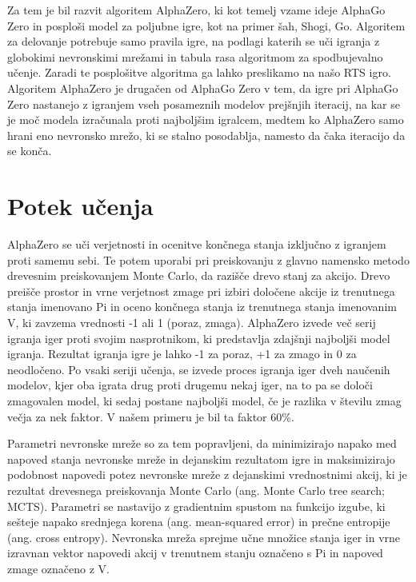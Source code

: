 \documentclass[a4paper, 12pt]{book}
\begin{document}
\noindent
Za tem je bil razvit algoritem AlphaZero, ki kot temelj vzame ideje AlphaGo Zero in posploši model za poljubne igre, kot na primer šah, Shogi, Go.
Algoritem za delovanje potrebuje samo pravila igre, na podlagi katerih se uči igranja z globokimi nevronskimi mrežami in tabula rasa algoritmom za spodbujevalno učenje.
Zaradi te posplošitve algoritma ga lahko preslikamo na našo RTS igro.
Algoritem AlphaZero je drugačen od AlphaGo Zero v tem, da igre pri AlphaGo Zero nastanejo z igranjem vseh posameznih modelov prejšnjih iteracij, na kar se je moč modela izračunala proti najboljšim igralcem, medtem ko AlphaZero samo hrani eno nevronsko mrežo, ki se stalno posodablja, namesto da čaka iteracijo da se konča.

\section{Potek učenja}
\label{potekUcenja}
AlphaZero se uči verjetnosti in ocenitve končnega stanja izključno z igranjem proti samemu sebi. 
Te potem uporabi pri preiskovanju z glavno namensko metodo drevesnim preiskovanjem Monte Carlo, da razišče drevo stanj za akcijo.
Drevo preišče prostor in vrne verjetnost zmage pri izbiri določene akcije iz trenutnega stanja imenovano Pi in oceno končnega stanja iz trenutnega stanja imenovanim V, ki zavzema vrednosti -1 ali 1 (poraz, zmaga).
AlphaZero izvede več serij igranja iger proti svojim nasprotnikom, ki predstavlja zdajšnji najboljši model igranja.
Rezultat igranja igre je lahko -1 za poraz, +1 za zmago in 0 za neodločeno.
Po vsaki seriji učenja, se izvede proces igranja iger dveh naučenih modelov, kjer oba igrata drug proti drugemu nekaj iger, na to pa se določi zmagovalen model, ki sedaj postane najboljši model, če je razlika v številu zmag večja za nek faktor. V našem primeru je bil ta faktor 60\%.

Parametri nevronske mreže so za tem popravljeni, da minimizirajo napako med napoved stanja nevronske mreže in dejanskim rezultatom igre in maksimizirajo podobnost napovedi potez nevronske mreže z dejanskimi vrednostnimi akcij, ki je rezultat drevesnega preiskovanja Monte Carlo (ang. Monte Carlo tree search; MCTS). 
Parametri se nastavijo z gradientnim spustom na funkcijo izgube, ki sešteje napako srednjega korena (ang. mean-squared error) in prečne entropije (ang. cross entropy).
Nevronska mreža sprejme učne množice stanja iger in vrne izravnan vektor napovedi akcij v trenutnem stanju označeno s Pi in napoved zmage označeno z V.
\end{document}
